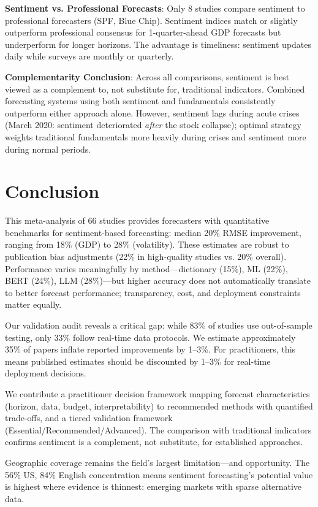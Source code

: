 \documentclass[11pt]{article}
\begin{document}
\textbf{Sentiment vs. Professional Forecasts}: Only 8 studies compare sentiment to professional forecasters (SPF, Blue Chip). Sentiment indices match or slightly outperform professional consensus for 1-quarter-ahead GDP forecasts but underperform for longer horizons. The advantage is timeliness: sentiment updates daily while surveys are monthly or quarterly.

\textbf{Complementarity Conclusion}: Across all comparisons, sentiment is best viewed as a complement to, not substitute for, traditional indicators. Combined forecasting systems using both sentiment and fundamentals consistently outperform either approach alone. However, sentiment lags during acute crises (March 2020: sentiment deteriorated \emph{after} the stock collapse); optimal strategy weights traditional fundamentals more heavily during crises and sentiment more during normal periods.

\section{Conclusion}

This meta-analysis of 66 studies provides forecasters with quantitative benchmarks for sentiment-based forecasting: median 20\% RMSE improvement, ranging from 18\% (GDP) to 28\% (volatility). These estimates are robust to publication bias adjustments (22\% in high-quality studies vs. 20\% overall). Performance varies meaningfully by method---dictionary (15\%), ML (22\%), BERT (24\%), LLM (28\%)---but higher accuracy does not automatically translate to better forecast performance; transparency, cost, and deployment constraints matter equally.

Our validation audit reveals a critical gap: while 83\% of studies use out-of-sample testing, only 33\% follow real-time data protocols. We estimate approximately 35\% of papers inflate reported improvements by 1--3\%. For practitioners, this means published estimates should be discounted by 1--3\% for real-time deployment decisions.

We contribute a practitioner decision framework mapping forecast characteristics (horizon, data, budget, interpretability) to recommended methods with quantified trade-offs, and a tiered validation framework (Essential/Recommended/Advanced). The comparison with traditional indicators confirms sentiment is a complement, not substitute, for established approaches.

Geographic coverage remains the field's largest limitation---and opportunity. The 56\% US, 84\% English concentration means sentiment forecasting's potential value is highest where evidence is thinnest: emerging markets with sparse alternative data.
\end{document}
